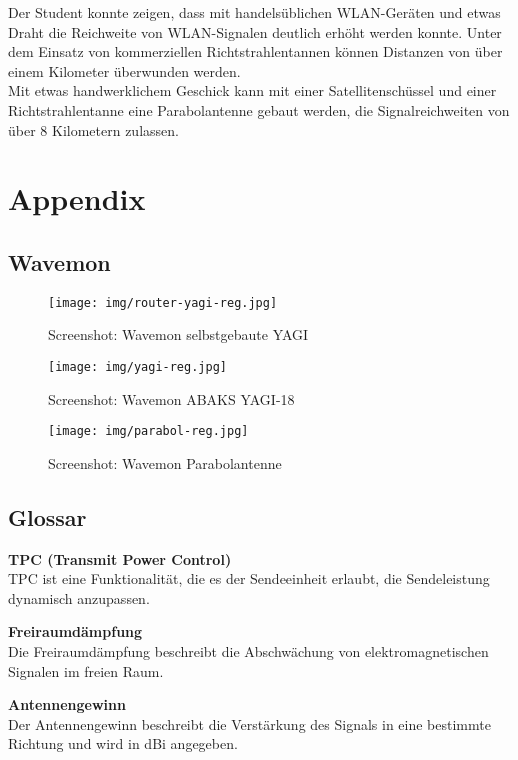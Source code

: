 \documentclass[oneside,11pt,parskip=half,ngerman]{scrreprt}
\makeatletter
\def\maxwidth{\ifdim\Gin@nat@width>\linewidth\linewidth
\else\Gin@nat@width\fi}
\let\Oldincludegraphics\includegraphics
\renewcommand{\includegraphics}[1]{\Oldincludegraphics[width=\maxwidth,height=20em,keepaspectratio]{#1}}
\makeatother
\begin{document}
Der Student konnte zeigen, dass mit handelsüblichen WLAN-Geräten und
etwas Draht die Reichweite von WLAN-Signalen deutlich erhöht werden
konnte. Unter dem Einsatz von kommerziellen Richtstrahlentannen können
Distanzen von über einem Kilometer überwunden werden.\\Mit etwas
handwerklichem Geschick kann mit einer Satellitenschüssel und einer
Richtstrahlentanne eine Parabolantenne gebaut werden, die
Signalreichweiten von über 8 Kilometern zulassen.

\appendix

\chapter{Appendix}\label{appendixA}

\section{Wavemon}\label{wavemon}

\begin{figure}[htbp]
\centering
\texttt{[image: img/router-yagi-reg.jpg]}
\caption{Screenshot: Wavemon selbstgebaute
YAGI\label{fig:router-yagi-reg}}
\end{figure}

\begin{figure}[htbp]
\centering
\texttt{[image: img/yagi-reg.jpg]}
\caption{Screenshot: Wavemon ABAKS YAGI-18\label{fig:yagi-reg}}
\end{figure}

\begin{figure}[htbp]
\centering
\texttt{[image: img/parabol-reg.jpg]}
\caption{Screenshot: Wavemon
Parabolantenne\label{fig:parabolantenne-reg}}
\end{figure}

\section{Glossar}\label{glossar}

\textbf{TPC (Transmit Power Control)}\\TPC ist eine Funktionalität, die
es der Sendeeinheit erlaubt, die Sendeleistung dynamisch anzupassen.

\textbf{Freiraumdämpfung}\\Die Freiraumdämpfung beschreibt die
Abschwächung von elektromagnetischen Signalen im freien Raum.

\textbf{Antennengewinn}\\Der Antennengewinn beschreibt die Verstärkung
des Signals in eine bestimmte Richtung und wird in dBi angegeben.
\end{document}
